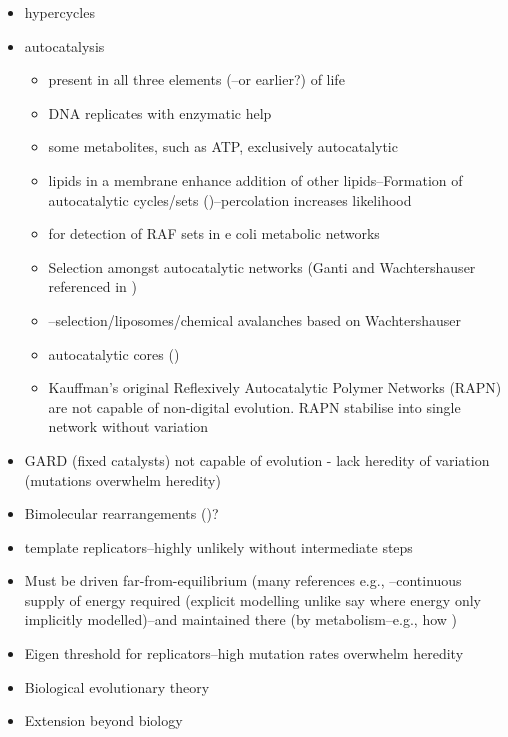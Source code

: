 \begin{itemize}
	\item
	      hypercycles \autocite{Eigen1971}
	\item
	      autocatalysis
	      \begin{itemize}
	      	\item
	      	      present in all three elements (\autocite{Ganti:2003hl}--or
	      	      earlier?) of life
	      	\item
	      	      DNA replicates with enzymatic help
	      	\item
	      	      some metabolites, such as ATP, exclusively autocatalytic
	      	\item
	      	      lipids in a membrane enhance addition of other lipids--Formation of
	      	      autocatalytic cycles/sets (\autocite{Hordijk2004})--percolation increases
	      	      likelihood
	      	\item
	      	      \autocite{Sousa2015} for detection of RAF sets in e coli metabolic
	      	      networks
	      	\item
	      	      Selection amongst autocatalytic networks (Ganti and Wachtershauser referenced in \autocite{Fernando:2005ly})
	      	\item
	      	      \autocite{Fernando:2007pf}--selection/liposomes/chemical avalanches
	      	      based on Wachtershauser
	      	\item
	      	      autocatalytic cores (\autocite{Vasas2012})
	      	\item
	      	      Kauffman's original Reflexively Autocatalytic Polymer Networks
	      	      (RAPN) \autocite{Kauffman1986,Farmer1986} are not capable of
	      	      non-digital evolution. RAPN stabilise into single network without
	      	      variation
	      \end{itemize}
	\item
	      GARD (fixed catalysts) \autocite{Segre1998} not capable of evolution -
	      lack heredity of variation (mutations overwhelm heredity) \autocite{Vasas2010}
	\item
	      Bimolecular rearrangements (\autocite{Fernando:2008xy,Fernando:2007pf})?
	\item
	      template replicators--highly unlikely without intermediate steps
	\item
	      Must be driven far-from-equilibrium (many references e.g.,
	      \autocite{Pascal2015}--continuous supply of energy required (explicit
	      modelling unlike say \autocite{Fontana1994} where energy only
	      implicitly modelled)--and maintained there (by metabolism--e.g., how
	      )
	\item
	      Eigen threshold for replicators--high mutation rates overwhelm
	      heredity
	\item
	      Biological evolutionary theory
	\item
	      Extension beyond biology
	      	

\end{itemize}
